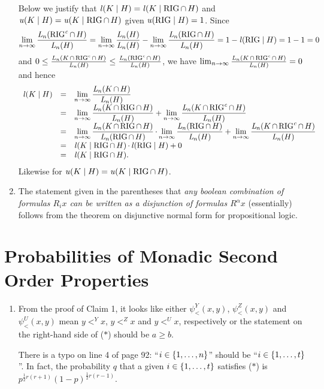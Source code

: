\begin{enumerate}[1.]
Below we justify that $\lprob(K \wrt H) = \lprob(K \wrt \rigid \intsc H)$ and $\uprob(K \wrt H) = \uprob(K \wrt \rigid \intsc H)$ given $\uprob(\rigid \wrt H) = 1$. Since
\[
\lim_{n \to \infty} \frac{\lclass{n}(\cmpl{\rigid} \intsc H)}{\lclass{n}(H)} = \lim_{n \to \infty} \frac{\lclass{n}(H)}{\lclass{n}(H)} - \lim_{n \to \infty} \frac{\lclass{n}(\rigid \intsc H)}{\lclass{n}(H)} = 1 - \lprob(\rigid \wrt H) = 1 - 1 = 0
\]
and $0 \leq \frac{\mathit{L}_{n}(K \mathop{\cap} \mathrm{RIG}^\mathit{c} \mathop{\cap} H)}{\mathit{L}_{n}(H)} \leq \frac{\mathit{L}_{n}(\mathrm{RIG}^\mathit{c} \mathop{\cap} H)}{\mathit{L}_{n}(H)}$, we have $\lim_{n \to \infty} \frac{\mathit{L}_{n}(K \mathop{\cap} \mathrm{RIG}^\mathit{c} \mathop{\cap} H)}{\mathit{L}_{n}(H)} = 0$ and hence
\[
\begin{array}{lll}
\lprob(K \wrt H) & = & \displaystyle \lim_{n \to \infty} \frac{\lclass{n}(K \intsc H)}{\lclass{n}(H)} \cr
\ & = & \displaystyle \lim_{n \to \infty} \frac{\lclass{n}(K \intsc \rigid \intsc H)}{\lclass{n}(H)} + \lim_{n \to \infty} \frac{\lclass{n}(K \intsc \cmpl{\rigid} \intsc H)}{\lclass{n}(H)} \cr
\ & = & \displaystyle \lim_{n \to \infty} \frac{\lclass{n}(K \intsc \rigid \intsc H)}{\lclass{n}(\rigid \intsc H)} \mul \lim_{n \to \infty} \frac{\lclass{n}(\rigid \intsc H)}{\lclass{n}(H)} + \lim_{n \to \infty} \frac{\lclass{n}(K \intsc \cmpl{\rigid} \intsc H)}{\lclass{n}(H)} \cr
\ & = & \lprob(K \wrt \rigid \intsc H) \mul \lprob(\rigid \wrt H) + 0 \cr
\ & = & \lprob(K \wrt \rigid \intsc H).
\end{array}
\]
Likewise for $\uprob(K \wrt H) = \uprob(K \wrt \rigid \intsc H)$.
%
\item {} The statement given in the parentheses that \emph{any boolean combination of formulas $R_i x$ can be written as a disjunction of formulas $R^\alpha x$} (essentially) follows from the theorem on disjunctive normal form for propositional logic.
%
\end{enumerate}


\setcounter{section}{4}
\section{Probabilities of Monadic Second Order Properties}
\begin{enumerate}[1.]
%
\item {} From the proof of Claim 1, it looks like either $\psi^Y_<(x, y)$, $\psi^Z_<(x, y)$ and $\psi^U_<(x, y)$ mean $y <^Y x$, $y <^Z x$ and $y <^U x$, respectively or the statement on the right-hand side of ($\ast$) should be $a \geq b$.

There is a typo on line 4 of page 92: ``$i \in {\{1, \ldots, n\}}$'' should be ``$i \in {\{1, \ldots, t\}}$''. In fact, the probability $q$ that a given $i \in {\{1, \ldots, t\}}$ satisfies ($\ast$) is $p^{\frac{1}{2}r(r + 1)}(1 - p)^{\frac{1}{2}r(r - 1)}$.
%
\end{enumerate}


